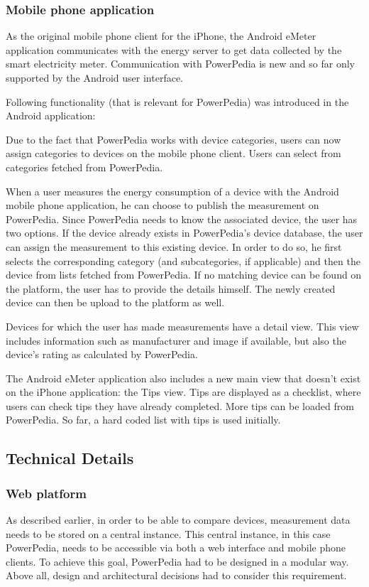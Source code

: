 \subsubsection{Mobile phone application}

As the original mobile phone client for the iPhone, the Android eMeter application communicates with the energy server to get data collected by the smart electricity meter. Communication with PowerPedia is new and so far only supported by the Android user interface.
 
Following functionality (that is relevant for PowerPedia) was introduced in the Android application:

Due to the fact that PowerPedia works with device categories, users can now assign categories to devices on the mobile phone client. Users can select from categories fetched from PowerPedia.

When a user measures the energy consumption of a device with the Android mobile phone application, he can choose to publish the measurement on PowerPedia. Since PowerPedia needs to know the associated device, the user has two options. If the device already exists in PowerPedia's device database, the user can assign the measurement to this existing device. In order to do so, he first selects the corresponding category (and subcategories, if applicable) and then the device from lists fetched from PowerPedia.
If no matching device can be found on the platform, the user has to provide the details himself. The newly created device can then be upload to the platform as well.  
 
Devices for which the user has made measurements have a detail view. This view includes information such as manufacturer and image if available, but also the device's rating as calculated by PowerPedia.  

The Android eMeter application also includes a new main view that doesn't exist on the iPhone application: the Tips view. Tips are displayed as a checklist, where users can check tips they have already completed. More tips can be loaded from PowerPedia. So far, a hard coded list with tips is used initially. 

\subsection{Technical Details}
\subsubsection{Web platform}
As described earlier, in order to be able to compare devices, measurement data needs to be stored on a central instance. This central instance, in this case PowerPedia, needs to be accessible via both a web interface and mobile phone clients. To achieve this goal, PowerPedia had to be designed in a modular way. Above all, design and architectural decisions had to consider this requirement.

